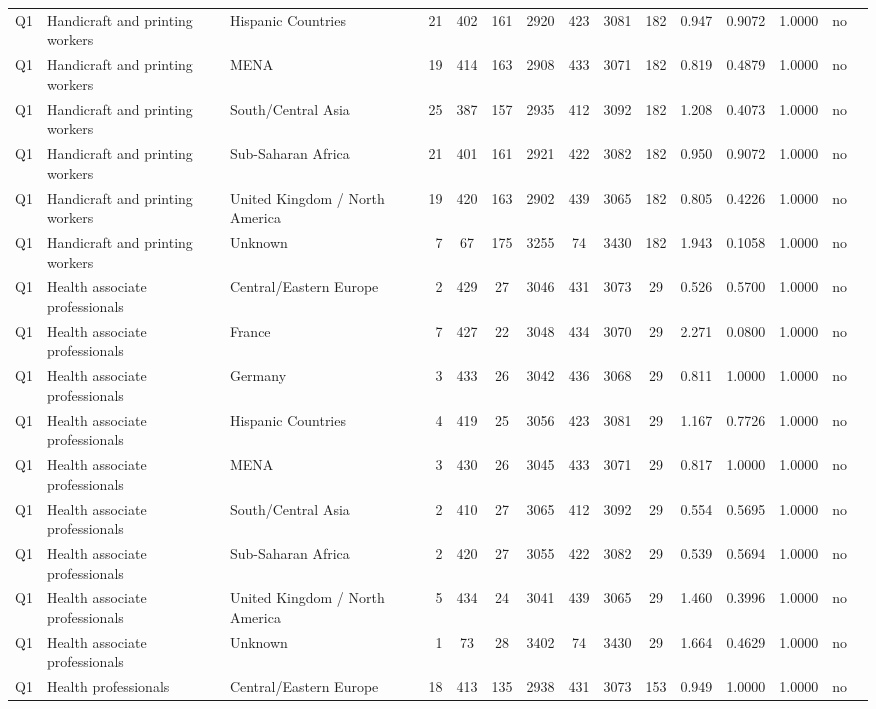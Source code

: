 \begin{longtable}{lllrcccccccccll}
Q1 & Handicraft and printing workers & Hispanic Countries & 21 & 402 & 161 & 2920 & 423 & 3081 & 182 & 0.947 & 0.9072 & 1.0000 & no \\
Q1 & Handicraft and printing workers & MENA & 19 & 414 & 163 & 2908 & 433 & 3071 & 182 & 0.819 & 0.4879 & 1.0000 & no \\
Q1 & Handicraft and printing workers & South/Central Asia & 25 & 387 & 157 & 2935 & 412 & 3092 & 182 & 1.208 & 0.4073 & 1.0000 & no \\
Q1 & Handicraft and printing workers & Sub-Saharan Africa & 21 & 401 & 161 & 2921 & 422 & 3082 & 182 & 0.950 & 0.9072 & 1.0000 & no \\
Q1 & Handicraft and printing workers & United Kingdom / North America & 19 & 420 & 163 & 2902 & 439 & 3065 & 182 & 0.805 & 0.4226 & 1.0000 & no \\
Q1 & Handicraft and printing workers & Unknown & 7 & 67 & 175 & 3255 & 74 & 3430 & 182 & 1.943 & 0.1058 & 1.0000 & no \\
Q1 & Health associate professionals & Central/Eastern Europe & 2 & 429 & 27 & 3046 & 431 & 3073 & 29 & 0.526 & 0.5700 & 1.0000 & no \\
Q1 & Health associate professionals & France & 7 & 427 & 22 & 3048 & 434 & 3070 & 29 & 2.271 & 0.0800 & 1.0000 & no \\
Q1 & Health associate professionals & Germany & 3 & 433 & 26 & 3042 & 436 & 3068 & 29 & 0.811 & 1.0000 & 1.0000 & no \\
Q1 & Health associate professionals & Hispanic Countries & 4 & 419 & 25 & 3056 & 423 & 3081 & 29 & 1.167 & 0.7726 & 1.0000 & no \\
Q1 & Health associate professionals & MENA & 3 & 430 & 26 & 3045 & 433 & 3071 & 29 & 0.817 & 1.0000 & 1.0000 & no \\
Q1 & Health associate professionals & South/Central Asia & 2 & 410 & 27 & 3065 & 412 & 3092 & 29 & 0.554 & 0.5695 & 1.0000 & no \\
Q1 & Health associate professionals & Sub-Saharan Africa & 2 & 420 & 27 & 3055 & 422 & 3082 & 29 & 0.539 & 0.5694 & 1.0000 & no \\
Q1 & Health associate professionals & United Kingdom / North America & 5 & 434 & 24 & 3041 & 439 & 3065 & 29 & 1.460 & 0.3996 & 1.0000 & no \\
Q1 & Health associate professionals & Unknown & 1 & 73 & 28 & 3402 & 74 & 3430 & 29 & 1.664 & 0.4629 & 1.0000 & no \\
Q1 & Health professionals & Central/Eastern Europe & 18 & 413 & 135 & 2938 & 431 & 3073 & 153 & 0.949 & 1.0000 & 1.0000 & no \\

\end{longtable}
